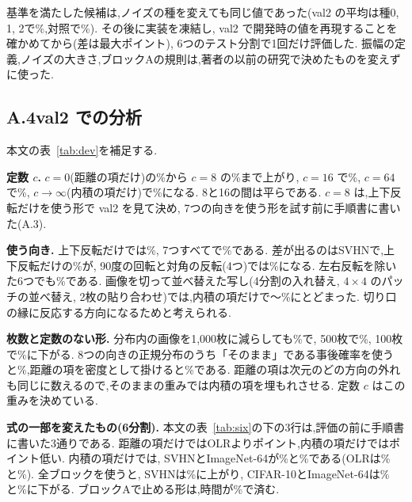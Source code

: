 \documentclass[MIRU,submit]{miru2025j}
\newcommand{\Ours}{OLR}   %
\begin{document}
基準を満たした候補は,ノイズの種を変えても同じ値であった(val2 の平均は種0, 1, 2で\olDevSeeds\%,対照で\olDevSeedsEq\%). その後に実装を凍結し, val2 で開発時の値を再現することを確かめてから(差は最大\olDevDiff{}ポイント), 6つのテスト分割で1回だけ評価した. 振幅の定義,ノイズの大きさ,ブロックAの規則は,著者の以前の研究で決めたものを変えずに使った.

\subsection*{A.4\quad val2 での分析}
本文の表~\ref{tab:dev}を補足する.

\textbf{定数 $c$.} $c=0$(距離の項だけ)の\olDevCzero\%から $c=8$ の\olDevCeight\%まで上がり, $c=16$ で\olDevCsixteen\%, $c=64$ で\olDevCsixtyfour\%, $c\to\infty$(内積の項だけ)で\olDevCinf\%になる. 8と16の間は平らである. $c=8$ は,上下反転だけを使う形で val2 を見て決め, 7つの向きを使う形を試す前に手順書に書いた(A.3).

\textbf{使う向き.} 上下反転だけでは\olDevOv\%, 7つすべてで\olDevCeight\%である. 差が出るのはSVHNで,上下反転だけの\olDevSVHNOv\%が, 90度の回転と対角の反転(4つ)では\olDevSVHNOquarter\%になる. 左右反転を除いた6つでも\olDevOnomirror\%である. 画像を切って並べ替えた写し(4分割の入れ替え, $4{\times}4$ のパッチの並べ替え, 2枚の貼り合わせ)では,内積の項だけで\olDevCutMin{}〜\olDevCutMax\%にとどまった. 切り口の縁に反応する方向になるためと考えられる.

\textbf{枚数と定数のない形.} 分布内の画像を1{,}000枚に減らしても\olDevNthousand\%で, 500枚で\olDevNfivehundred\%, 100枚で\olDevNhundred\%に下がる. 8つの向きの正規分布のうち「そのまま」である事後確率を使うと\olDevPk\%,距離の項を密度として掛けると\olDevPkd\%である. 距離の項は\olNBlkCten{}次元のどの方向の外れも同じに数えるので,そのままの重みでは内積の項を埋もれさせる. 定数 $c$ はこの重みを決めている.

\textbf{式の一部を変えたもの(6分割).} 本文の表~\ref{tab:six}の下の3行は,評価の前に手順書に書いた3通りである. 距離の項だけでは\Ours{}より\olSixTGap{}ポイント,内積の項だけでは\olSixLGap{}ポイント低い. 内積の項だけでは, SVHNとImageNet-64が\olSixLSVHN\%と\olSixLIN\%である(\Ours{}は\olSixSVHN\%と\olSixIN\%). 全ブロックを使うと, SVHNは\olSixAllSVHN\%に上がり, CIFAR-10とImageNet-64は\olSixAllCten\%と\olSixAllIN\%に下がる. ブロックAで止める形は,時間が\olFwdAShare\%で済む.
\end{document}
